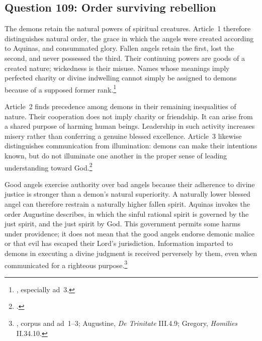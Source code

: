 
\subsection{Question 109: Order surviving rebellion}\label{q109}
The demons retain the natural powers of spiritual creatures. Article~1 therefore distinguishes natural order, the grace in which the angels were created according to Aquinas, and consummated glory. Fallen angels retain the first, lost the second, and never possessed the third. Their continuing powers are goods of a created nature; wickedness is their misuse. Names whose meanings imply perfected charity or divine indwelling cannot simply be assigned to demons because of a supposed former rank.\footnote{, especially ad~3.}

Article~2 finds precedence among demons in their remaining inequalities of nature. Their cooperation does not imply charity or friendship. It can arise from a shared purpose of harming human beings. Leadership in such activity increases misery rather than conferring a genuine blessed excellence. Article~3 likewise distinguishes communication from illumination: demons can make their intentions known, but do not illuminate one another in the proper sense of leading understanding toward God.\footnote{.}

Good angels exercise authority over bad angels because their adherence to divine justice is stronger than a demon's natural superiority. A naturally lower blessed angel can therefore restrain a naturally higher fallen spirit. Aquinas invokes the order Augustine describes, in which the sinful rational spirit is governed by the just spirit, and the just spirit by God. This government permits some harms under providence; it does not mean that the good angels endorse demonic malice or that evil has escaped their Lord's jurisdiction. Information imparted to demons in executing a divine judgment is received perversely by them, even when communicated for a righteous purpose.\footnote{, corpus and ad~1--3; Augustine, \emph{De Trinitate} III.4.9; Gregory, \emph{Homilies} II.34.10.}

